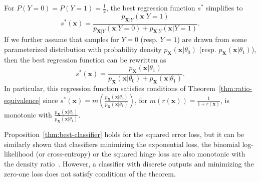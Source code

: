 \documentclass[12pt]{article}
\numberwithin{equation}{section}
\theoremstyle{plain}
\begin{document}
For $P(Y=0)=P(Y=1)=\frac{1}{2}$, the best regression function $s^*$ simplifies
to
\begin{equation}
s^*(\mathbf{x}) = \frac{p_{\mathbf{X}|Y}(\mathbf{x}|Y=1)}{p_{\mathbf{X}|Y}(\mathbf{x} | Y=0) + p_{\mathbf{X}|Y}(\mathbf{x} | Y=1)}.
\end{equation}
If we further assume that samples for $Y=0$ (resp. $Y=1$) are drawn from some parameterized
distribution with probability density $p_{\mathbf{X}}(\mathbf{x}|\theta_0)$ (resp. $p_{\mathbf{X}}(\mathbf{x}|\theta_1)$), then the best regression function can be rewritten
as
\begin{equation}
s^*(\mathbf{x}) = \frac{p_{\mathbf{X}}(\mathbf{x}|\theta_1)}{p_{\mathbf{X}}(\mathbf{x} | \theta_0) + p_{\mathbf{X}}(\mathbf{x} | \theta_1)}.
\end{equation}
In particular, this regression function satisfies conditions of
Theorem~\ref{thm:ratio-equivalence} since $s^*(\mathbf{x}) =
m(\frac{p_\mathbf{X}(\mathbf{x}|\theta_0)}{p_\mathbf{X}(\mathbf{x}|\theta_1)})$,
for $m(r(\mathbf{x})) = \frac{1}{1 + r(\mathbf{x})}$, is monotonic with
$\frac{p_\mathbf{X}(\mathbf{x}|\theta_0)}{p_\mathbf{X}(\mathbf{x}|\theta_1)}$.

Proposition~\ref{thm:best-classifier} holds for the squared error loss, but it
can be similarly shown that classifiers minimizing the exponential loss, the
binomial log-likelihood (or cross-entropy) or the squared hinge loss are also
monotonic with the density ratio~\citep{friedman2000additive,lin2002support}.
However, a classifier with discrete outputs and minimizing the zero-one loss
does not satisfy conditions of the theorem.
\end{document}
